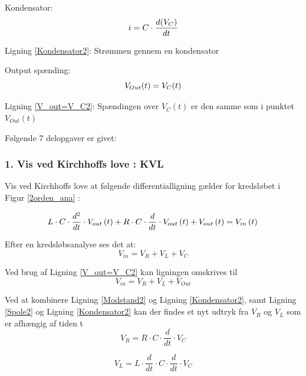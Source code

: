 Kondensator:
\begin{equation}
 i =C\cdot \frac{d(V_{C})}{dt}
\label{Kondensator2}\\
\end{equation}
\begin{center}
Ligning \ref{Kondensator2}: Strømmen gennem en kondensator
\end{center}

Output spænding:
\begin{equation}
V_{Out}(t) = V_{C}(t)
\label{V_out=V_C2}\\
\end{equation}
\begin{center}
Ligning \ref{V_out=V_C2}: Spændingen over $V_ {C}(t)$ er den samme som i punktet $V_{Out}(t)$
\end{center}

Følgende 7 delopgaver er givet:
\subsubsection*{1. Vis ved Kirchhoffs love : KVL}
Vis ved Kirchhoffs love at følgende differentialligning gælder for kredsløbet i Figur \ref{2orden_ana} : 

\begin{equation}
	L\cdot C\cdot \dfrac{d^{2}}{dt}\cdot V_{out}  \left(t\right) +R\cdot C\cdot \dfrac{d}{dt}\cdot V_{out}  \left(t\right) +V_{out}  \left(t\right)  = V_{in}  \left(t\right)
\label{dfLigning2}\\
\end{equation}

Efter en kredsløbsanalyse ses det at:
\begin{equation} V_{in}=V_{R}+V_L+V_{C}
\label{V_in:KVL2}
\end{equation}
 
 Ved brug af Ligning \ref{V_out=V_C2}  kan ligningen omskrives til 
\begin{equation}
V_{in}=V_{R} + V_L + V_{Out}
\label{V_0:KVL2}
\end{equation}

Ved at kombinere Ligning \ref{Modstand2} og Ligning \ref{Kondensator2}, samt Ligning \ref{Spole2} og Ligning \ref{Kondensator2} kan der findes et nyt udtryk fra $V_{R}$ og $V_L$ som er afhængig af tiden t
\begin{equation}
	V_{R} = R\cdot C\cdot \dfrac{d}{dt}\cdot V_C
\end{equation}

\begin{equation}
	V_{L} = L\cdot \dfrac{d}{dt} \cdot C\cdot \dfrac{d}{dt}\cdot V_C   
\end{equation}

